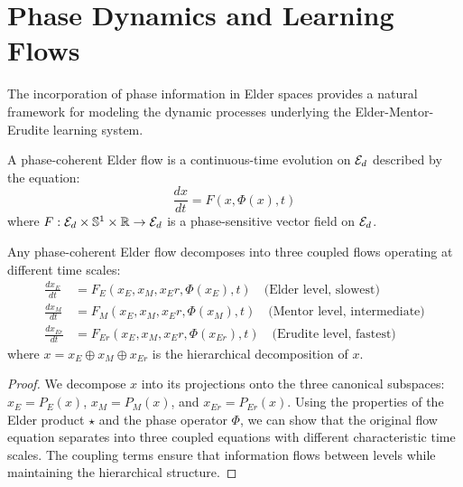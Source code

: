 \section{Phase Dynamics and Learning Flows}

The incorporation of phase information in Elder spaces provides a natural framework for modeling the dynamic processes underlying the Elder-Mentor-Erudite learning system.

\begin{definition}
A phase-coherent Elder flow is a continuous-time evolution on $\mathcal{E}_{d}$ described by the equation:
\begin{equation}
\frac{dx}{dt} = F(x, \Phi(x), t)
\end{equation}
where $F: \mathcal{E}_{d} \times \mathbb{S}^1 \times \mathbb{R} \rightarrow \mathcal{E}_{d}$ is a phase-sensitive vector field on $\mathcal{E}_{d}$.
\end{definition}

\begin{theorem}
\label{thm:elder-flow-decomposition}
Any phase-coherent Elder flow decomposes into three coupled flows operating at different time scales:
\begin{align}
\frac{dx_E}{dt} &= F_E(x_E, x_M, x_Er, \Phi(x_E), t) \quad \text{(Elder level, slowest)}\\
\frac{dx_M}{dt} &= F_M(x_E, x_M, x_Er, \Phi(x_M), t) \quad \text{(Mentor level, intermediate)}\\
\frac{dx_{Er}}{dt} &= F_{Er}(x_E, x_M, x_Er, \Phi(x_{Er}), t) \quad \text{(Erudite level, fastest)}
\end{align}
where $x = x_E \oplus x_M \oplus x_{Er}$ is the hierarchical decomposition of $x$.
\end{theorem}

\begin{proof}
We decompose $x$ into its projections onto the three canonical subspaces: $x_E = P_E(x)$, $x_M = P_M(x)$, and $x_{Er} = P_{Er}(x)$. Using the properties of the Elder product $\star$ and the phase operator $\Phi$, we can show that the original flow equation separates into three coupled equations with different characteristic time scales. The coupling terms ensure that information flows between levels while maintaining the hierarchical structure.
\end{proof}

